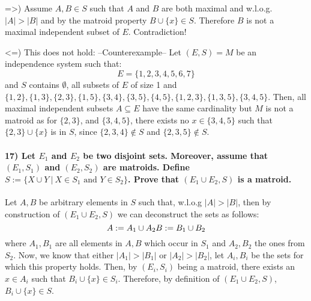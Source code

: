\documentclass[
]{article}
\begin{document}
=\textgreater) Assume \(A,B \in S\) such that \(A\) and \(B\) are both
maximal and w.l.o.g. \(|A| > |B|\) and by the matroid property
\(B \cup \{x\} \in S\). Therefore \(B\) is not a maximal independent
subset of \(E\). Contradiction!

\textless=) This does not hold: --Counterexample-- Let \((E,S) = M\) be
an independence system such that: \[
    E = \{1,2,3,4,5,6,7\}
    \] and \(S\) contains \(\emptyset\), all subsets of \(E\) of size 1
and
\(\{1,2\}, \{1,3\}, \{2,3\}, \{1,5\}, \{3,4\}, \{3,5\}, \{4,5\}, \{1,2,3\}, \{1,3,5\}, \{3,4,5\}\).
Then, all maximal independent subsets \(A \subseteq E\) have the same
cardinality but \(M\) is not a matroid as for \(\{2,3\}\), and
\(\{3,4,5\}\), there exists no \(x \in \{3,4,5\}\) such that
\(\{2,3\} \cup \{x\}\) is in \(S\), since \(\{2,3,4\} \notin S\) and
\(\{2,3,5\} \notin S\).

\hypertarget{let-e_1-and-e_2-be-two-disjoint-sets.-moreover-assume-that-e_1s_1-and-e_2s_2-are-matroids.-define-s-x-cup-y-x-in-s_1-text-and-y-in-s_2.-prove-that-e_1-cup-e_2-s-is-a-matroid.}{%
\paragraph{\texorpdfstring{17) Let \(E_1\) and \(E_2\) be two disjoint
sets. Moreover, assume that \((E_1,S_1)\) and \((E_2,S_2)\) are
matroids. Define
\(S := \{X \cup Y \ | \ X \in S_1 \text{ and } Y \in S_2\}\). Prove that
\((E_1 \cup E_2, S)\) is a
matroid.}{17) Let E\_1 and E\_2 be two disjoint sets. Moreover, assume that (E\_1,S\_1) and (E\_2,S\_2) are matroids. Define S := \textbackslash\{X \textbackslash cup Y \textbackslash{} \textbar{} \textbackslash{} X \textbackslash in S\_1 \textbackslash text\{ and \} Y \textbackslash in S\_2\textbackslash\}. Prove that (E\_1 \textbackslash cup E\_2, S) is a matroid.}}\label{let-e_1-and-e_2-be-two-disjoint-sets.-moreover-assume-that-e_1s_1-and-e_2s_2-are-matroids.-define-s-x-cup-y-x-in-s_1-text-and-y-in-s_2.-prove-that-e_1-cup-e_2-s-is-a-matroid.}}

Let \(A,B\) be arbitrary elements in \(S\) such that, w.l.o.g
\(|A| > |B|\), then by construction of \((E_1 \cup E_2, S)\) we can
deconstruct the sets as follows: \[
A := A_1 \cup A_2\\
B := B_1 \cup B_2
\] where \(A_1,B_1\) are all elements in \(A,B\) which occur in \(S_1\)
and \(A_2,B_2\) the ones from \(S_2\). Now, we know that either
\(|A_1| > |B_1|\) or \(|A_2| > |B_2|\), let \(A_i, B_i\) be the sets for
which this property holds. Then, by \((E_i, S_i)\) being a matroid,
there exists an \(x \in A_i\) such that \(B_i \cup \{x\} \in S_i\).
Therefore, by definition of \((E_1 \cup E_2, S)\),
\(B_i \cup \{x\} \in S\).
\end{document}
